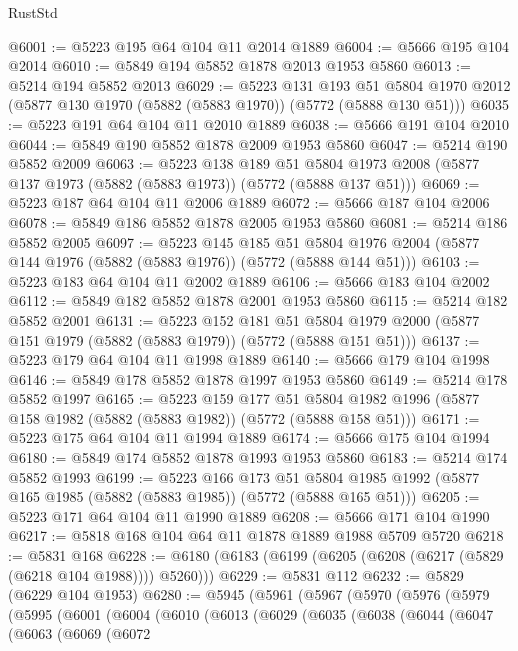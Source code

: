 \begin{lexlean}{RustStd}
\begin{coremodule}
@6001 := @5223 @195 @64 @104 @11 @2014 @1889
@6004 := @5666 @195 @104 @2014
@6010 := @5849 @194 @5852 @1878 @2013 @1953 @5860
@6013 := @5214 @194 @5852 @2013
@6029 := @5223
    @131
    @193
    @51
    @5804
    @1970
    @2012
    (@5877 @130 @1970 (@5882 (@5883 @1970)) (@5772 (@5888 @130 @51)))
@6035 := @5223 @191 @64 @104 @11 @2010 @1889
@6038 := @5666 @191 @104 @2010
@6044 := @5849 @190 @5852 @1878 @2009 @1953 @5860
@6047 := @5214 @190 @5852 @2009
@6063 := @5223
    @138
    @189
    @51
    @5804
    @1973
    @2008
    (@5877 @137 @1973 (@5882 (@5883 @1973)) (@5772 (@5888 @137 @51)))
@6069 := @5223 @187 @64 @104 @11 @2006 @1889
@6072 := @5666 @187 @104 @2006
@6078 := @5849 @186 @5852 @1878 @2005 @1953 @5860
@6081 := @5214 @186 @5852 @2005
@6097 := @5223
    @145
    @185
    @51
    @5804
    @1976
    @2004
    (@5877 @144 @1976 (@5882 (@5883 @1976)) (@5772 (@5888 @144 @51)))
@6103 := @5223 @183 @64 @104 @11 @2002 @1889
@6106 := @5666 @183 @104 @2002
@6112 := @5849 @182 @5852 @1878 @2001 @1953 @5860
@6115 := @5214 @182 @5852 @2001
@6131 := @5223
    @152
    @181
    @51
    @5804
    @1979
    @2000
    (@5877 @151 @1979 (@5882 (@5883 @1979)) (@5772 (@5888 @151 @51)))
@6137 := @5223 @179 @64 @104 @11 @1998 @1889
@6140 := @5666 @179 @104 @1998
@6146 := @5849 @178 @5852 @1878 @1997 @1953 @5860
@6149 := @5214 @178 @5852 @1997
@6165 := @5223
    @159
    @177
    @51
    @5804
    @1982
    @1996
    (@5877 @158 @1982 (@5882 (@5883 @1982)) (@5772 (@5888 @158 @51)))
@6171 := @5223 @175 @64 @104 @11 @1994 @1889
@6174 := @5666 @175 @104 @1994
@6180 := @5849 @174 @5852 @1878 @1993 @1953 @5860
@6183 := @5214 @174 @5852 @1993
@6199 := @5223
    @166
    @173
    @51
    @5804
    @1985
    @1992
    (@5877 @165 @1985 (@5882 (@5883 @1985)) (@5772 (@5888 @165 @51)))
@6205 := @5223 @171 @64 @104 @11 @1990 @1889
@6208 := @5666 @171 @104 @1990
@6217 := @5818 @168 @104 @64 @11 @1878 @1889 @1988 @5709 @5720
@6218 := @5831 @168
@6228 := @6180 (@6183 (@6199 (@6205 (@6208 (@6217 (@5829 (@6218 @104 @1988)))) @5260)))
@6229 := @5831 @112
@6232 := @5829 (@6229 @104 @1953)
@6280 := @5945
    (@5961
      (@5967
        (@5970
          (@5976
            (@5979
              (@5995
                (@6001
                  (@6004
                    (@6010
                      (@6013
                        (@6029
                          (@6035
                            (@6038
                              (@6044
                                (@6047
                                  (@6063
                                    (@6069
                                      (@6072

\end{coremodule}
\end{lexlean}
